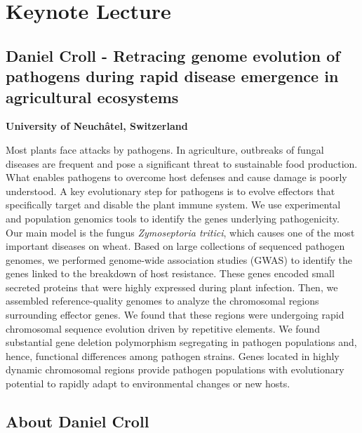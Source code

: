 \documentclass[12pt,]{book}
\theoremstyle{definition}
\theoremstyle{definition}
\theoremstyle{remark}
\begin{document}
\newpage

\section*{Keynote Lecture}\label{keynote-lecture-5}

\subsection*{Daniel Croll - Retracing genome evolution of pathogens
during rapid disease emergence in agricultural
ecosystems}\label{daniel-croll---retracing-genome-evolution-of-pathogens-during-rapid-disease-emergence-in-agricultural-ecosystems}

\textbf{University of Neuchâtel, Switzerland}

Most plants face attacks by pathogens. In agriculture, outbreaks of
fungal diseases are frequent and pose a significant threat to
sustainable food production. What enables pathogens to overcome host
defenses and cause damage is poorly understood. A key evolutionary step
for pathogens is to evolve effectors that specifically target and
disable the plant immune system. We use experimental and population
genomics tools to identify the genes underlying pathogenicity. Our main
model is the fungus \emph{Zymoseptoria tritici}, which causes one of the
most important diseases on wheat. Based on large collections of
sequenced pathogen genomes, we performed genome-wide association studies
(GWAS) to identify the genes linked to the breakdown of host resistance.
These genes encoded small secreted proteins that were highly expressed
during plant infection. Then, we assembled reference-quality genomes to
analyze the chromosomal regions surrounding effector genes. We found
that these regions were undergoing rapid chromosomal sequence evolution
driven by repetitive elements. We found substantial gene deletion
polymorphism segregating in pathogen populations and, hence, functional
differences among pathogen strains. Genes located in highly dynamic
chromosomal regions provide pathogen populations with evolutionary
potential to rapidly adapt to environmental changes or new hosts.

\subsection*{About Daniel Croll}\label{about-daniel-croll}
\end{document}
